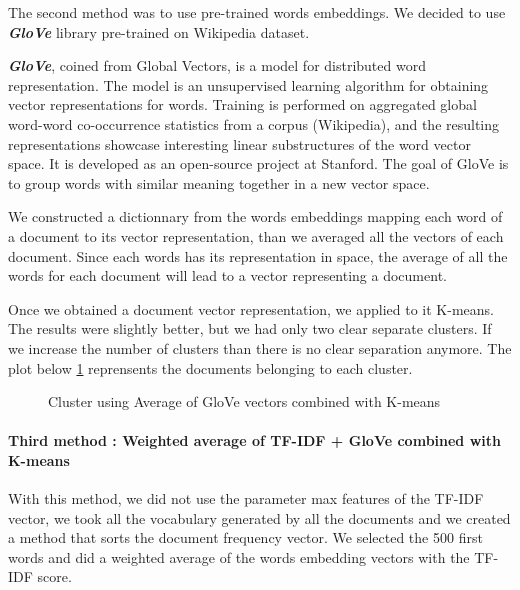 \documentclass[article,twocolumn]{IEEEtran}
\begin{document}
The second method was to use pre-trained words embeddings. We decided to
use \textbf{\emph{GloVe}} library pre-trained on Wikipedia dataset.

\textbf{\emph{GloVe}}, coined from Global Vectors, is a model for
distributed word representation. The model is an unsupervised learning
algorithm for obtaining vector representations for words. Training is
performed on aggregated global word-word co-occurrence statistics from a
corpus (Wikipedia), and the resulting representations showcase
interesting linear substructures of the word vector space. It is
developed as an open-source project at Stanford.\cite{GloVe} The goal of
GloVe is to group words with similar meaning together in a new vector
space.

We constructed a dictionnary from the words embeddings mapping each word
of a document to its vector representation, than we averaged all the
vectors of each document. Since each words has its representation in
space, the average of all the words for each document will lead to a
vector representing a document.

Once we obtained a document vector representation, we applied to it
K-means. The results were slightly better, but we had only two clear
separate clusters. If we increase the number of clusters than there is
no clear separation anymore. The plot below \ref{fig4} reprensents the
documents belonging to each cluster.


    \begin{figure}
        \begin{center}\end{center}
        \caption{Cluster using Average of GloVe vectors combined with K-means }
        \label{fig4}
    \end{figure}
    
    \hypertarget{third-method-weighted-average-of-tf-idf-glove-combined-with-k-means}{%
\paragraph{Third method : Weighted average of TF-IDF + GloVe combined
with
K-means}\label{third-method-weighted-average-of-tf-idf-glove-combined-with-k-means}}

With this method, we did not use the parameter max features of the
TF-IDF vector, we took all the vocabulary generated by all the documents
and we created a method that sorts the document frequency vector. We
selected the 500 first words and did a weighted average of the words
embedding vectors with the TF-IDF score.
\end{document}
